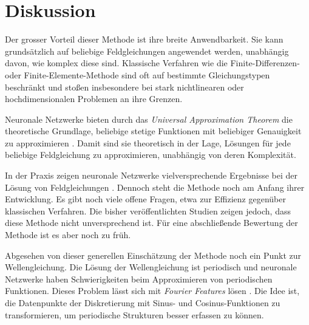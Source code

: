 %
%
%
%

\section{Diskussion\label{neuronal:section:diskussion}}

Der grosser Vorteil dieser Methode ist ihre breite Anwendbarkeit.
Sie kann grundsätzlich auf beliebige Feldgleichungen angewendet werden, unabhängig davon, wie komplex diese sind.
Klassische Verfahren wie die Finite-Differenzen- oder Finite-Elemente-Methode sind oft auf bestimmte Gleichungstypen beschränkt und stoßen insbesondere bei stark nichtlinearen oder hochdimensionalen Problemen an ihre Grenzen.

Neuronale Netzwerke bieten durch das \emph{Universal Approximation Theorem} die theoretische Grundlage, beliebige stetige Funktionen mit beliebiger Genauigkeit zu approximieren \cite{neuronal:universal_approximation_theorem}. 
Damit sind sie theoretisch in der Lage, Lösungen für jede beliebige Feldgleichung zu approximieren, unabhängig von deren Komplexität.

In der Praxis zeigen neuronale Netzwerke vielversprechende Ergebnisse bei der Lösung von Feldgleichungen \cite{neuronal:pinns}. 
Dennoch steht die Methode noch am Anfang ihrer Entwicklung. 
Es gibt noch viele offene Fragen, etwa zur Effizienz gegenüber klassischen Verfahren.
Die bisher veröffentlichten Studien zeigen jedoch, dass diese Methode nicht unversprechend ist.
Für eine abschließende Bewertung der Methode ist es aber noch zu früh. 

Abgesehen von dieser generellen Einschätzung der Methode noch ein Punkt zur Wellengleichung.
Die Lösung der Wellengleichung ist periodisch und neuronale Netzwerke haben Schwierigkeiten beim Approximieren von periodischen Funktionen.
Dieses Problem lässt sich mit \emph{Fourier Features} lösen \cite{neuronal:fourier_features}.
Die Idee ist, die Datenpunkte der Diskretierung mit Sinus- und Cosinus-Funktionen zu transformieren, um periodische Strukturen besser erfassen zu können.
